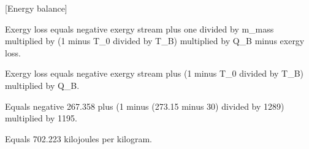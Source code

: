 [Energy balance]  

Exergy loss equals negative exergy stream plus one divided by m_mass multiplied by (1 minus T_0 divided by T_B) multiplied by Q_B minus exergy loss.  

Exergy loss equals negative exergy stream plus (1 minus T_0 divided by T_B) multiplied by Q_B.  

Equals negative 267.358 plus (1 minus (273.15 minus 30) divided by 1289) multiplied by 1195.  

Equals 702.223 kilojoules per kilogram.